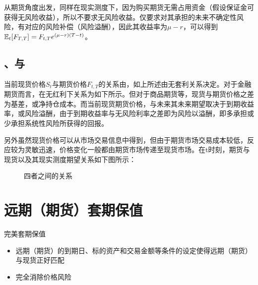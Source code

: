 \documentclass[11pt]{article}
\begin{document}
从期货角度出发，同样在现实测度下，因为购买期货无需占用资金（假设保证金可获得无风险收益），所以不要求无风险收益。仅要求对其承担的未来不确定性风险，有对应的风险补偿（风险溢酬），因此其收益率为$\mu-r$，可以得到$\mathbb{E}_t[F_{T,T}] = F_{t,T} e^{(\mu-r)(T-t)}$。

\subsection{、与}

当前现货价格$S_t$与期货价格$F_{t,T}$的关系由，如上所述由无套利关系决定。对于金融期货而言，在无红利下关系为如下所示。但对于商品期货等，现货与期货价格之差为基差，或净持仓成本。而当前现货期货价格，与未来其未来期望取决于到期收益率，或风险溢酬，由于到期收益率与无风险利率之差即为风险以溢酬，即多承担或少承担系统性风险所获得的回报。

另外虽然现货价格可以从市场交易信息中得到，但由于期货市场交易成本较低，反应较为灵敏迅速，价格变化一般都由期货市场传递至现货市场。在t时刻，期货与现货以及其现实测度期望关系如下图所示：

\begin{figure}[H]  
    \centering
    \caption{四者之间的关系}
\end{figure}

\section{远期（期货）套期保值}

完美套期保值
\begin{itemize}
    \item 远期（期货）的到期日、标的资产和交易金额等条件的设定使得远期（期货）与现货正好匹配
    \item 完全消除价格风险
\end{itemize}
\end{document}
